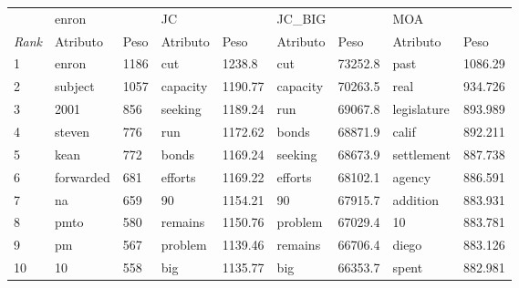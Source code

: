 \begin{tabular}{lllllllll}
	\toprule
	{}            & \multicolumn{2}{l}{enron} & \multicolumn{2}{l}{JC} & \multicolumn{2}{l}{JC\_BIG} & \multicolumn{2}{l}{MOA}                                              \\
	\textit{Rank} & Atributo                  & Peso                   & Atributo                    & Peso                    & Atributo & Peso    & Atributo    & Peso    \\
	\midrule
	1             & enron                     & 1186                   & cut                         & 1238.8                  & cut      & 73252.8 & past        & 1086.29 \\[3pt]
	2             & subject                   & 1057                   & capacity                    & 1190.77                 & capacity & 70263.5 & real        & 934.726 \\[3pt]
	3             & 2001                      & 856                    & seeking                     & 1189.24                 & run      & 69067.8 & legislature & 893.989 \\[3pt]
	4             & steven                    & 776                    & run                         & 1172.62                 & bonds    & 68871.9 & calif       & 892.211 \\[3pt]
	5             & kean                      & 772                    & bonds                       & 1169.24                 & seeking  & 68673.9 & settlement  & 887.738 \\[3pt]
	6             & forwarded                 & 681                    & efforts                     & 1169.22                 & efforts  & 68102.1 & agency      & 886.591 \\[3pt]
	7             & na                        & 659                    & 90                          & 1154.21                 & 90       & 67915.7 & addition    & 883.931 \\[3pt]
	8             & pmto                      & 580                    & remains                     & 1150.76                 & problem  & 67029.4 & 10          & 883.781 \\[3pt]
	9             & pm                        & 567                    & problem                     & 1139.46                 & remains  & 66706.4 & diego       & 883.126 \\[3pt]
	10            & 10                        & 558                    & big                         & 1135.77                 & big      & 66353.7 & spent       & 882.981 \\
	\bottomrule
\end{tabular}


